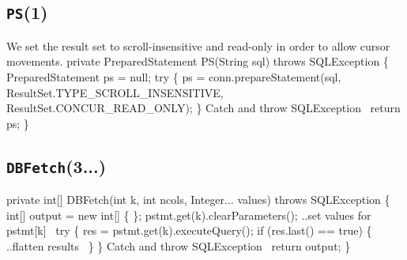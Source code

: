 \documentclass{article}
\def\nwendcode{\endtrivlist \endgroup}
\theoremstyle{definition}
\begin{document}
\subsection{{\tt{}\protect{}PS}(1)}
We set the result set to scroll-insensitive and read-only in order to allow
cursor movements.
\nwenddocs{}\endmoddef{}
private PreparedStatement PS(String sql) throws SQLException \{
  PreparedStatement ps = null;
  try \{
    ps = conn.prepareStatement(sql,
      ResultSet.TYPE_SCROLL_INSENSITIVE, ResultSet.CONCUR_READ_ONLY);
  \}
  \LA{}Catch and throw \code{}SQLException\edoc{}~{\nwtagstyle{}}\RA{}
  return ps;
\}
\eatline
{}\nwendcode{}\subsection{{\tt{}\protect{}DBFetch}(3...)}
\label{sec:fetch}
\nwenddocs{}\endmoddef{}
private int[] DBFetch(int k, int ncols, Integer... values) throws SQLException \{
  int[] output = new int[] \{ \};
  pstmt.get(k).clearParameters();
  \LA{}..set values for \code{}pstmt[k]\edoc{}~{\nwtagstyle{}}\RA{}
  try \{
    res = pstmt.get(k).executeQuery();
    if (res.last() == true) \{
      \LA{}..flatten results~{\nwtagstyle{}}\RA{}
    \}
  \}
  \LA{}Catch and throw \code{}SQLException\edoc{}~{\nwtagstyle{}}\RA{}
  return output;
\}
\eatline
{}\nwendcode{}\endmoddef{}
\end{document}
